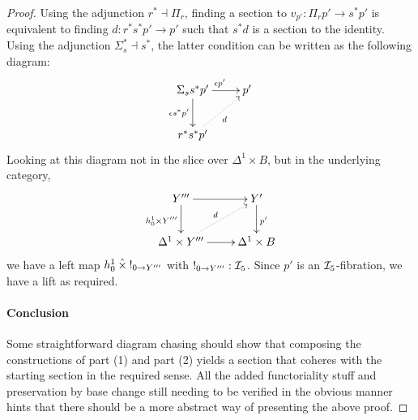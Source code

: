 \documentclass[reqno,10pt,a4paper,oneside]{amsart}
\begin{document}
\begin{proof}
Using the adjunction $r^* \dashv \Pi_r$, finding a section to $v_{p'} : \Pi_r p' \to s^* p'$ is equivalent to finding $d : r^* s^* p' \to p'$ such that $s^* d$ is a section to the identity.
Using the adjunction $\Sigma_s^* \dashv s^*$, the latter condition can be written as the following diagram:
\[
\xymatrix{
  \Sigma_s s^* p'
  \ar[r]^{\epsilon p'}
  \ar[d]_{\epsilon s^* p'}
&
  p'
\\
  r^* s^* p'
  \ar@{.>}[ur]_{d}
}
\]
Looking at this diagram not in the slice over $\Delta^1 \times B$, but in the underlying category,
\[
\xymatrix{
  Y'''
  \ar[d]_{h_0^1 \times Y'''}
  \ar[r]
&
  Y'
  \ar[d]^{p'}
\\
  \Delta^1 \times Y'''
  \ar[r]
  \ar@{.>}[ur]^{d}
&
  \Delta^1 \times B
}
\]
we have a left map $h_0^1 \hattimes \canonical_{0 \to Y'''}$ with $\canonical_{0 \to Y'''} : \cal{I}_5$.
Since $p'$ is an $\cal{I}_5$-fibration, we have a lift as required.

\paragraph{Conclusion}

Some straightforward diagram chasing should show that composing the constructions of part (1) and part (2) yields a section that coheres with the starting section in the required sense.
All the added functoriality stuff and preservation by base change still needing to be verified in the obvious manner hints that there should be a more abstract way of presenting the above proof.
\end{proof}
\end{document}
